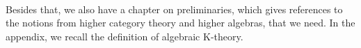 \\
Besides that, we also have a chapter on preliminaries, which gives references to the notions from higher category theory and higher algebras, that we need. 
In the appendix, we recall the definition of algebraic K-theory. 
